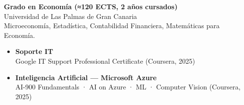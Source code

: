 \documentclass[10pt, a4paper]{awesome-cv}
\begin{document}
\begin{minipage}[t]{0.32\textwidth}
\par\vspace{6pt}
\textbf{Grado en Economía (≈120 ECTS, 2 años cursados)}\\
{\small Universidad de Las Palmas de Gran Canaria  }\\
{\footnotesize\color{graytext}Microeconomía, Estadística, Contabilidad Financiera, Matemáticas para Economía.}



\begin{itemize}[leftmargin=*, label={}, itemsep=4pt]
\item \textbf{Soporte IT}\\{\footnotesize\color{graytext}Google IT Support Professional Certificate (Coursera, 2025) }
\item \textbf{Inteligencia Artificial — Microsoft Azure}\\{\footnotesize\color{graytext}AI-900 Fundamentals · AI on Azure · ML · Computer Vision (Coursera, 2025) }
\end{itemize}


\end{minipage}%
\hfill
\end{document}
